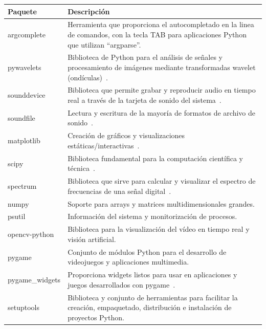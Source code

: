 \begin{center}
\begin{tabular}{|p{2.5cm}|p{12.6cm}|}
    \hline
    \textbf{Paquete} & \textbf{Descripción } \\
    \hline
    argcomplete & Herramienta que proporciona el autocompletado en la linea de comandos, con la tecla TAB para aplicaciones Python que utilizan ``argparse''. \\
    \hline
    pywavelets & Biblioteca de Python para el análisis de señales y procesamiento de imágenes mediante transformadas wavelet (ondículas)~\cite{pywavelets}. \\
    \hline
    sounddevice & Biblioteca que permite grabar y reproducir audio en tiempo real a través de la tarjeta de sonido del sistema~\cite{sounddevice}. \\
    \hline
    soundfile & Lectura y escritura de la mayoría de formatos de archivo de sonido~\cite{soundfile}. \\
    \hline
    matplotlib & Creación de gráficos y visualizaciones estáticas/interactivas~\cite{matplotlib}. \\
    \hline
    scipy & Biblioteca fundamental para la computación científica y técnica~\cite{scipy}. \\
    \hline
    spectrum & Biblioteca que sirve para calcular y visualizar el espectro de frecuencias de una señal digital~\cite{spectrum}. \\
    \hline
    numpy & Soporte para arrays y matrices multidimensionales grandes. \\
    \hline
    psutil & Información del sistema y monitorización de procesos. \\
    \hline
    opencv-python & Biblioteca para la visualización del vídeo en tiempo real y visión artificial. \\
    \hline
    pygame & Conjunto de módulos Python para el desarrollo de videojuegos y aplicaciones multimedia. \\
    \hline
    pygame\_widgets & Proporciona widgets listos para usar en aplicaciones y juegos desarrollados con pygame~\cite{pygame_widgets}. \\
    \hline
    setuptools & Biblioteca y conjunto de herramientas para facilitar la creación, empaquetado, distribución e instalación de proyectos Python. \\
    \hline
\end{tabular}
\label{tab:paquetes}
\end{center}

